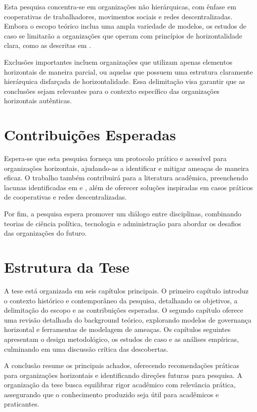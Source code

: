 Esta pesquisa concentra-se em organizações não hierárquicas,
com ênfase em cooperativas de trabalhadores, movimentos
sociais e redes descentralizadas. Embora o escopo teórico
inclua uma ampla variedade de modelos, os estudos de caso se
limitarão a organizações que operam com princípios de
horizontalidade clara, como as descritas em
\cite{WorkerCooperativesinAmerica}.

Exclusões importantes incluem organizações que utilizam
apenas elementos horizontais de maneira parcial, ou aquelas
que possuem uma estrutura claramente hierárquica disfarçada
de horizontalidade. Essa delimitação visa garantir que as
conclusões sejam relevantes para o contexto específico das
organizações horizontais autênticas.

\section{Contribuições Esperadas}
\label{sec:contribuicoes-esperadas}

Espera-se que esta pesquisa forneça um protocolo prático e
acessível para organizações horizontais, ajudando-as a
identificar e mitigar ameaças de maneira eficaz. O trabalho
também contribuirá para a literatura acadêmica, preenchendo
lacunas identificadas em \cite{ParticipatoryThreatModelling}
e \cite{ThreatModelingASummaryOfAvailableMethods}, além de
oferecer soluções inspiradas em casos práticos de
cooperativas e redes descentralizadas.

Por fim, a pesquisa espera promover um diálogo entre
disciplinas, combinando teorias de ciência política,
tecnologia e administração para abordar os desafios das
organizações do futuro.

\section{Estrutura da Tese}
\label{sec:estrutura-tese}

A tese está organizada em seis capítulos principais. O
primeiro capítulo introduz o contexto histórico e
contemporâneo da pesquisa, detalhando os objetivos, a
delimitação do escopo e as contribuições esperadas. O
segundo capítulo oferece uma revisão detalhada do background
teórico, explorando modelos de governança horizontal e
ferramentas de modelagem de ameaças. Os capítulos seguintes
apresentam o design metodológico, os estudos de caso e as
análises empíricas, culminando em uma discussão crítica das
descobertas.

A conclusão resume os principais achados, oferecendo
recomendações práticas para organizações horizontais e
identificando direções futuras para pesquisa. A organização
da tese busca equilibrar rigor acadêmico com relevância
prática, assegurando que o conhecimento produzido seja útil
para acadêmicos e praticantes.

